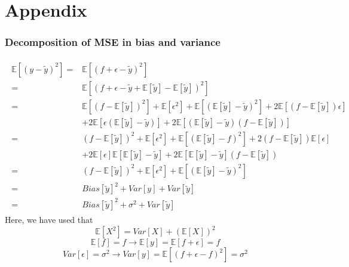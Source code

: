 \onecolumn
\setcounter{equation}{0}
\renewcommand\theequation{A.\arabic{equation}}
\section*{Appendix}
\label{sec:appendix}
\subsubsection*{Decomposition of MSE in bias and variance}
\begin{align}\label{eq:derivation_bias_variance}
\begin{split}
	\mathds{E}[(y-\tilde{y})^2] =& \mathds{E}[(f+\epsilon - \tilde{y})^2] \\
	=& \mathds{E}[\left(f+\epsilon - \tilde{y} + \mathds{E}[\tilde{y}] - \mathds{E}[\tilde{y}]\right)^2] \\
	=& \mathds{E}[(f-\mathds{E}[\tilde{y}])^2] + \mathds{E}[\epsilon^2] + \mathds{E}[(\mathds{E}[\tilde{y}]-\tilde{y})^2] + 2\mathds{E}[(f-\mathds{E}[\tilde{y}])\epsilon] \\
	&+ 2\mathds{E}[\epsilon(\mathds{E}[\tilde{y}]-\tilde{y})] + 2\mathds{E}[(\mathds{E}[\tilde{y}]-\tilde{y})(f-\mathds{E}[\tilde{y}])] \\
	=& (f-\mathds{E}[\tilde{y}])^2 + \mathds{E}[\epsilon^2] + \mathds{E}[(\mathds{E}[\tilde{y}]-f)^2] + 2(f-\mathds{E}[\tilde{y}])\mathds{E}[\epsilon] \\
	&+ 2\mathds{E}[\epsilon]\mathds{E}[\mathds{E}[\tilde{y}]-\tilde{y}] + 2\mathds{E}[\mathds{E}[\tilde{y}]-\tilde{y}](f-\mathds{E}[\tilde{y}]) \\
	=& (f-\mathds{E}[\tilde{y}])^2 + \mathds{E}[\epsilon^2] + \mathds{E}[(\mathds{E}[\tilde{y}]-\tilde{y})^2] \\
	=& Bias[\tilde{y}]^2 + Var[y] + Var[\tilde{y}] \\
	=& Bias[\tilde{y}]^2 + \sigma^2 + Var[\tilde{y}]
\end{split}
\end{align}
Here, we have used that
\begin{equation*}
	\mathds{E}[X^2] = Var[X] + \left(\mathds{E}[X]\right)^2
\end{equation*}
\begin{equation*}
	\mathds{E}[f]=f \rightarrow \mathds{E}[y]=\mathds{E}[f+\epsilon] = f
\end{equation*}
\begin{equation*}
	Var[\epsilon] = \sigma^2 \rightarrow Var[y] = \mathds{E}[(f+\epsilon-f)^2] = \sigma^2
\end{equation*}

